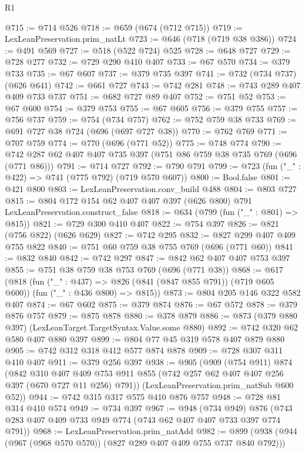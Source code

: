 \begin{lexlean}{R1}
\begin{coremodule}
@715 := @714 @526
@718 := @659 (@674 (@712 @715))
@719 := LexLeanPreservation.prim_natLt
@723 := @646 (@718 (@719 @38 @386))
@724 := @491 @569
@727 := @518 (@522 @724) @525
@728 := @648 @727
@729 := @728 @277
@732 := @729 @290 @410 @407
@733 := @67 @570
@734 := @379 @733
@735 := @67 @607
@737 := @379 @735 @397
@741 := @732 (@734 @737) (@626 @641)
@742 := @661 @727
@743 := @742 @281
@748 := @743 @289 @407 @409 @733 @737
@751 := @682 @727 @89 @407
@752 := @751 @52
@753 := @67 @600
@754 := @379 @753
@755 := @67 @605
@756 := @379 @755
@757 := @756 @737
@759 := @754 (@734 @757)
@762 := @752 @759 @38 @733
@769 := @691 @727 @38 @724 (@696 (@697 @727 @38))
@770 := @762 @769
@771 := @707 @759
@774 := @770 (@696 (@771 @52))
@775 := @748 @774
@790 := @742 @287 @62 @407 @407 @735 @397 (@751 @86 @759 @38 @735 @769 (@696 (@771 @86)))
@791 := @714 @727
@792 := @790 @791
@799 := @723 (fun ("_" : @422) => @741 (@775 @792) (@719 @570 @607))
@800 := Bool.false
@801 := @421 @800
@803 := LexLeanPreservation.conv_build @488
@804 := @803 @727
@815 := @804 @172 @154 @62 @407 @407 @397 (@626 @800) @791 LexLeanPreservation.construct_false
@818 := @634 (@799 (fun ("_" : @801) => @815))
@821 := @729 @300 @410 @407
@822 := @754 @397
@826 := @821 (@756 @822) (@626 @629)
@827 := @742 @295
@832 := @827 @299 @407 @409 @755 @822
@840 := @751 @60 @759 @38 @755 @769 (@696 (@771 @60))
@841 := @832 @840
@842 := @742 @297
@847 := @842 @62 @407 @407 @753 @397
@855 := @751 @38 @759 @38 @753 @769 (@696 (@771 @38))
@868 := @617
    (@818
      (fun ("_" : @437) => @826 (@841 (@847 @855 @791)) (@719 @605 @600))
      (fun ("_" : @436 @800) => @815))
@873 := @804 @205 @146 @322 @582 @407
@874 := @67 @602
@875 := @379 @874
@876 := @67 @572
@878 := @379 @876 @757
@879 := @875 @878
@880 := @378 @879
@886 := @873 (@379 @880 @397) (LexLeanTarget.TargetSyntax.Value.some @880)
@892 := @742 @320 @62 @580 @407 @880 @397
@899 := @804 @77 @45 @319 @578 @407 @879 @880
@905 := @742 @312 @318 @412 @577 @874 @878
@909 := @728 @307 @311 @410 @407
@911 := @379 @256 @397
@938 := @905
    (@909
      (@754 @911)
      @874
      (@842
        @310
        @407
        @409
        @753
        @911
        @855
        (@742 @257 @62 @407 @407 @256 @397 (@670 @727 @11 @256) @791))
      (LexLeanPreservation.prim_natSub @600 @52))
@944 := @742 @315 @317 @575 @410 @876 @757
@948 := @728 @81 @314 @410 @574
@949 := @734 @397
@967 := @948
    (@734 @949)
    @876
    (@743 @283 @407 @409 @733 @949 @774 (@743 @62 @407 @407 @733 @397 @774 @791))
@968 := LexLeanPreservation.prim_natAdd
@982 := @899 (@938 (@944 (@967 (@968 @570 @570)) (@827 @289 @407 @409 @755 @737 @840 @792)))

\end{coremodule}
\end{lexlean}
